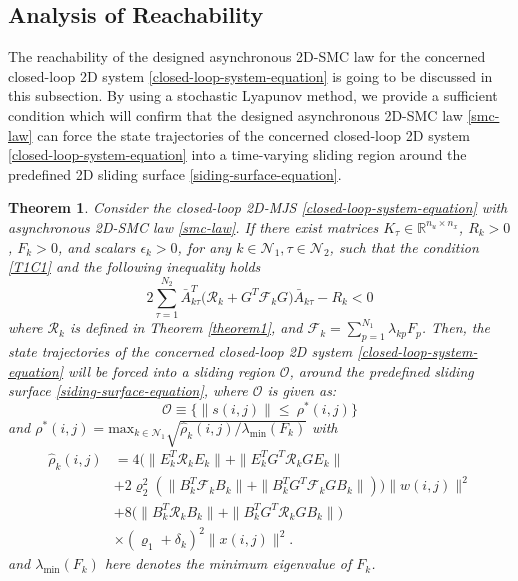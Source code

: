 \documentclass[journal,final,twocolumn]{IEEEtran}
\newtheorem{theorem}{Theorem}
\begin{document}
\subsection{Analysis of Reachability}\label{minimization} 
	 The reachability of the  designed asynchronous 2D-SMC law for the concerned closed-loop 2D system \eqref{closed-loop-system-equation} is going to be discussed in this subsection. By using a stochastic Lyapunov method, we provide a sufficient condition which will confirm that the designed asynchronous 2D-SMC law \eqref{smc-law} can force the state trajectories of the concerned closed-loop 2D system \eqref{closed-loop-system-equation} into a time-varying sliding region around the predefined 2D sliding surface \eqref{siding-surface-equation}.
	 

\begin{theorem}\label{theorem2}	
	Consider the closed-loop 2D-MJS \eqref{closed-loop-system-equation} with asynchronous 2D-SMC law \eqref{smc-law}. If there exist matrices $K_{\tau }\in\mathbb{R}^{n_u\times n_x}$, $R_{k}>0$, $F_{k}>0$, and  scalars $\epsilon_{k}>0$, for any $k\in\mathcal{N}_{1}, \tau\in\mathcal{N}_{2}$, such that the condition \eqref{T1C1} and the following inequality holds
	\begin{equation} \label{T2C1}
		2\sum_{\tau =1}^{N_{2}} \bar{A}^{T}_{k\tau }\big(\mathcal{R}_{k}+G^{T}\mathcal{F}_{k}G\big)\bar{A}_{k\tau }-R_{k} <0
	\end{equation}
	where $\mathcal{R}_{k}$ is defined in Theorem \ref{theorem1}, and $\mathcal{F}_{k}=\sum_{p=1}^{N_{1}}\lambda_{kp}F_{p}$. Then, the state trajectories of the concerned closed-loop 2D system \eqref{closed-loop-system-equation} will be forced into a sliding region $\mathcal{O}$, around the predefined sliding surface \eqref{siding-surface-equation}, where  $\mathcal{O}$ is given as:
	\begin{equation}\label{smc-region}
		\mathcal{O}\equiv\Big\{\|s(i,j)\|\leq\ \rho^{*}(i,j) \Big\}
	\end{equation} 
	and $\rho^{*}(i,j) = \mathrm{max}_{k\in\mathcal{N}_{1}}\sqrt{\hat{\rho}_{k}(i,j)/
	\lambda_{\mathrm{min}}(F_{k})}$ with
	\begin{equation*}
		 \begin{split}
		 	\hat{\rho}_{k}(i,j)&=4\big(\|E^{T}_{k}\mathcal{R}_{k}E_{k}\|+ \|E^{T}_{k}G^{T}\mathcal{R}_{k}GE_{k}\|\\
		 	&+2\varrho_{2}^{2}(\|B^{T}_{k}\mathcal{F}_{k}B_{k}\|+ \|B^{T}_{k}G^{T}\mathcal{F}_{k}GB_{k}\| )\big)\|w(i,j)\|^{2}\\
		 	&+8\big(\|B^{T}_{k}\mathcal{R}_{k}B_{k}\|+\|B^{T}_{k}G^{T}\mathcal{R}_{k}GB_{k}\|\big)\\ &\times(\varrho_{1}+\delta_{k})^{2}\|x(i,j)\|^{2}.
		 \end{split}
	\end{equation*}
	and $\lambda_{\mathrm{min}}(F_{k})$ here denotes the minimum eigenvalue of $F_{k}$.
\end{theorem} 
\end{document}
